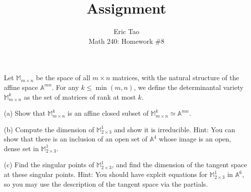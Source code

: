 \documentclass[10pt]{article}
\newenvironment{problem}[2][Problem]{\begin{trivlist}
\item[\hskip \labelsep {\bfseries #1}\hskip \labelsep {\bfseries #2.}]}{\end{trivlist}}
\begin{document}
 
\title{Assignment}
\author{Eric Tao\\
Math 240: Homework \#8}
\maketitle
 
\begin{problem}{8.1}

Let $\mathbb{M}_{m\times n}$ be the space of all $m \times n$ matrices, with the natural structure of the affine space $\mathbb{A}^{mn}$. For any $k \leq \min(m,n)$, we define the determinantal variety $\mathbb{M}_{m\times n}^k$ as the set of matrices of rank at most $k$.

(a) Show that $\mathbb{M}_{m\times n}^k$ is an affine closed subset of $\mathbb{M}_{m\times n}^k \simeq \mathbb{A}^{mn}$.

(b) Compute the dimension of  $\mathbb{M}_{2\times 3}^1$ and show it is irreducible. Hint: You can show that there is an inclusion of an open set of $\mathbb{A}^4$ whose image is an open, dense set in $\mathbb{M}_{2\times 3}^1$.

(c) Find the singular points of $\mathbb{M}_{2\times 3}^1$, and find the dimension of the tangent space at these singular points. Hint: You should have explcit equations for $\mathbb{M}_{2\times 3}^1$ in $\mathbb{A}^6$, so you may use the description of the tangent space via the partials.

\end{problem}
\end{document}
